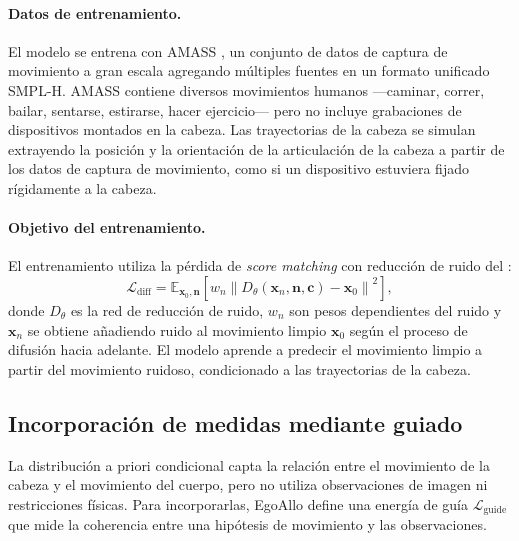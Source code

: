 \documentclass[../../book-main_es.tex]{subfiles}
\begin{document}
\paragraph{Datos de entrenamiento.}
El modelo se entrena con AMASS \citep{mahmood2019amass}, un conjunto de datos de captura de movimiento a gran escala
agregando múltiples fuentes en un formato unificado
SMPL-H. AMASS contiene diversos movimientos humanos ---caminar,
correr, bailar, sentarse, estirarse, hacer ejercicio--- pero no incluye grabaciones de dispositivos
montados en la cabeza. Las trayectorias de la cabeza se simulan extrayendo la
posición y la orientación de la articulación de la cabeza a partir de los datos de captura de movimiento, como si un
dispositivo estuviera fijado rígidamente a la cabeza.

\paragraph{Objetivo del entrenamiento.}
El entrenamiento utiliza la pérdida de \textit{score matching} con reducción de ruido del :
\begin{equation}
    \mathcal{L}_{\text{diff}} = \mathbb{E}_{\boldsymbol{x}_0, \boldsymbol{n}} \left[ w_n
    \left\| D_\theta(\boldsymbol{x}_n, \boldsymbol{n}, \boldsymbol{c}) - \boldsymbol{x}_0 \right\|^2 \right],
\end{equation}
donde $D_\theta$ es la red de reducción de ruido, $w_n$ son pesos dependientes del ruido
y $\boldsymbol{x}_n$ se obtiene añadiendo ruido al movimiento limpio
$\boldsymbol{x}_0$ según el proceso de difusión hacia adelante. El modelo
aprende a predecir el movimiento limpio a partir del movimiento ruidoso, condicionado a las trayectorias
de la cabeza.

\subsection{Incorporación de medidas mediante guiado}
\label{sub:egoallo_guidance}

La distribución a priori condicional capta la relación entre el movimiento de la cabeza
y el movimiento del cuerpo, pero no utiliza observaciones de imagen ni restricciones físicas.
Para incorporarlas, EgoAllo define una energía de guía
$\mathcal{L}_{\text{guide}}$ que mide la coherencia entre una
hipótesis de movimiento y las observaciones.
\end{document}
